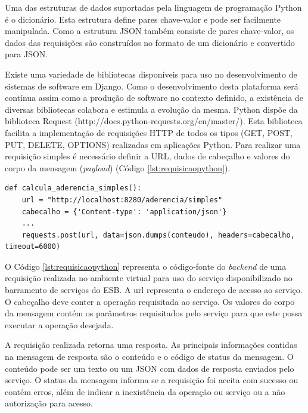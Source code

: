 Uma das estruturas de dados suportadas pela linguagem de programação Python é o dicionário. Esta estrutura define pares chave-valor e pode ser facilmente manipulada. Como a estrutura JSON também consiste de pares chave-valor, os dados das requisições são construídos no formato de um dicionário e convertido para JSON.

Existe uma variedade de bibliotecas disponíveis para uso no desenvolvimento de sistemas de software em Django. Como o desenvolvimento desta plataforma será contínua assim como a produção de software no contexto definido, a existência de diversas bibliotecas colabora e estimula a evolução da mesma. Python dispõe da biblioteca Request (http://docs.python-requests.org/en/master/). Esta biblioteca facilita a implementação de requisições HTTP de todos os tipos (GET, POST, PUT, DELETE, OPTIONS) realizadas em aplicações Python. Para realizar uma requisição simples é necessário definir a URL, dados de cabeçalho e valores do corpo da mensagem (\textit{payload}) (Código \ref{lst:requisicaopython}).


\begin{lstlisting}[caption={Requisição HTTP em Python utilizando a biblioteca Request.},label={lst:requisicaopython}]
def calcula_aderencia_simples():
    url = "http://localhost:8280/aderencia/simples"
    cabecalho = {'Content-type': 'application/json'}
    ...
    requests.post(url, data=json.dumps(conteudo), headers=cabecalho, timeout=6000)
\end{lstlisting}

O Código \ref{lst:requisicaopython} representa o código-fonte do \textit{backend} de uma requisição realizada no ambiente virtual para uso do serviço disponibilizado no barramento de serviços do ESB. A url representa o endereço de acesso ao serviço. O cabeçalho deve conter a operação requisitada ao serviço. Os valores do corpo da mensagem contém os parâmetros requisitados pelo serviço para que este possa executar a operação desejada.

A requisição realizada retorna uma resposta. As principais informações contidas na mensagem de resposta são o conteúdo e o código de status da mensagem. O conteúdo pode ser um texto ou um JSON com dados de resposta enviados pelo serviço. O status da mensagem informa se a requisição foi aceita com sucesso ou contém erros, além de indicar a inexistência da operação ou serviço ou a não autorização para acesso.


